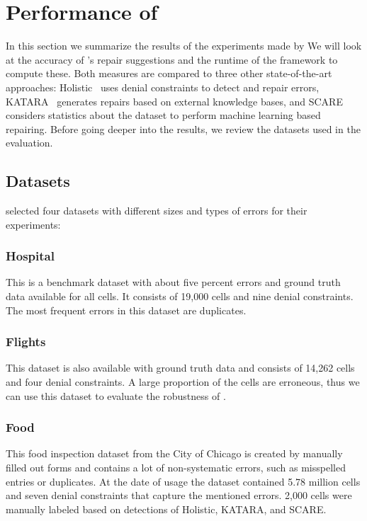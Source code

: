 \section{Performance of \holoclean{}}\label{sec:performance}
  In this section we summarize the results of the experiments made by \citeauthor{holoclean}
  We will look at the accuracy of \holoclean{}'s repair suggestions and the runtime of the framework to compute these.
  Both measures are compared to three other state-of-the-art approaches:
  Holistic~\cite{holistic} uses denial constraints to detect and repair errors,
  KATARA~\cite{katara} generates repairs based on external knowledge bases, and
  SCARE~\cite{scare} considers statistics about the dataset to perform machine learning based repairing.
  Before going deeper into the results, we review the datasets used in the evaluation.

  \subsection{Datasets}
  \citeauthor{holoclean} selected four datasets with different sizes and types of errors for their experiments:

  \subsubsection*{Hospital}
  This is a benchmark dataset with about five percent errors and ground truth data available for all cells.
  It consists of 19,000 cells and nine denial constraints.
  The most frequent errors in this dataset are duplicates.

  \subsubsection*{Flights}
  This dataset is also available with ground truth data and consists of 14,262 cells and four denial constraints.
  A large proportion of the cells are erroneous, thus we can use this dataset to evaluate the robustness of \holoclean{}.

  \subsubsection*{Food}
  This food inspection dataset from the City of Chicago is created by manually filled out forms and contains a lot of non-systematic errors, such as misspelled entries or duplicates.
  At the date of usage the dataset contained 5.78 million cells and seven denial constraints that capture the mentioned errors.
  2,000 cells were manually labeled based on detections of Holistic, KATARA, and SCARE.

